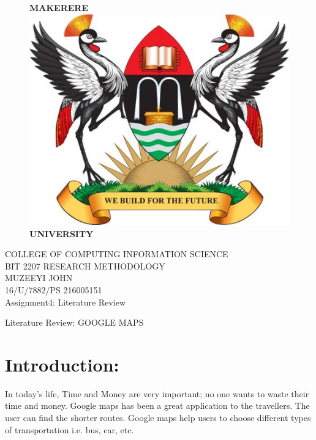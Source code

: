 \documentclass[11pt]{article}
\begin{document}
 \begin{center}
\begin{figure}[h!]

\centering \huge \textbf{MAKERERE\includegraphics[scale=0.1]{image}UNIVERSITY}
\end{figure}
 \begin{large}
{COLLEGE OF COMPUTING  INFORMATION SCIENCE}\\
BIT 2207 RESEARCH METHODOLOGY\\


MUZEEYI JOHN \\16/U/7882/PS 216005151\\
Assignment4: Literature Review

\end{large}
\end{center}
\newpage
\begin{huge}
 Literature Review: GOOGLE MAPS
\end{huge}
\section{Introduction:}
In today's life, Time and Money are very important; no one wants to waste their time and money.
 Google maps has been a great application to the travellers. The user can find the shorter routes. Google maps help users to choose different types of transportation i.e. bus, car, etc. 
\end{document}
